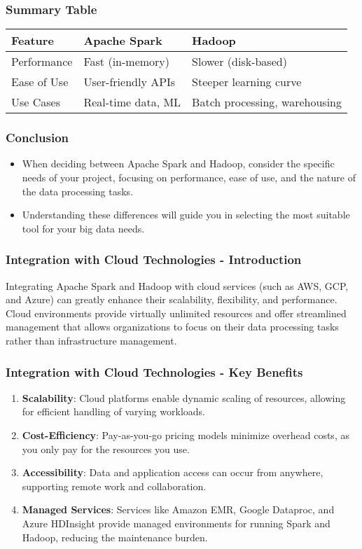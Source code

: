 \documentclass{beamer}
\begin{document}
\begin{frame}[fragile]
    \frametitle{Summary Table}
    \begin{tabular}{|l|l|l|}
        \hline
        \textbf{Feature} & \textbf{Apache Spark} & \textbf{Hadoop} \\
        \hline
        Performance & Fast (in-memory) & Slower (disk-based) \\
        \hline
        Ease of Use & User-friendly APIs & Steeper learning curve \\
        \hline
        Use Cases & Real-time data, ML & Batch processing, warehousing \\
        \hline
    \end{tabular}
\end{frame}

\begin{frame}[fragile]
    \frametitle{Conclusion}
    \begin{itemize}
        \item When deciding between Apache Spark and Hadoop, consider the specific needs of your project, focusing on performance, ease of use, and the nature of the data processing tasks.
        \item Understanding these differences will guide you in selecting the most suitable tool for your big data needs.
    \end{itemize}
\end{frame}

\begin{frame}[fragile]
    \frametitle{Integration with Cloud Technologies - Introduction}
    Integrating Apache Spark and Hadoop with cloud services (such as AWS, GCP, and Azure) can greatly enhance their scalability, flexibility, and performance. 
    Cloud environments provide virtually unlimited resources and offer streamlined management that allows organizations to focus on their data processing tasks rather than infrastructure management.
\end{frame}

\begin{frame}[fragile]
    \frametitle{Integration with Cloud Technologies - Key Benefits}
    \begin{enumerate}
        \item \textbf{Scalability}: Cloud platforms enable dynamic scaling of resources, allowing for efficient handling of varying workloads.
        \item \textbf{Cost-Efficiency}: Pay-as-you-go pricing models minimize overhead costs, as you only pay for the resources you use.
        \item \textbf{Accessibility}: Data and application access can occur from anywhere, supporting remote work and collaboration.
        \item \textbf{Managed Services}: Services like Amazon EMR, Google Dataproc, and Azure HDInsight provide managed environments for running Spark and Hadoop, reducing the maintenance burden.
    \end{enumerate}
\end{frame}
\end{document}
